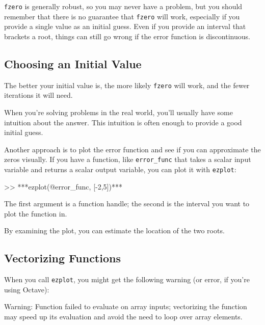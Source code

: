 {\tt fzero} is generally robust, so you may never have a problem, but you should remember that there is no guarantee that {\tt fzero} will work, especially if you provide a single value as an initial guess.  Even if you provide an interval that brackets a root, things can still go wrong if the error function is discontinuous.


\subsection{Choosing an Initial Value}

The better your initial value is, the more likely
{\tt fzero} will work, and the fewer iterations it will
need.

When you're solving problems in the real world, you'll usually
have some intuition about the answer.  This intuition is often enough
to provide a good initial guess.


Another approach is to plot the error function and see if you can
approximate the zeros visually.  If you have a function, like
\verb"error_func" that takes a scalar input variable and returns
a scalar output variable, you can plot it with {\tt ezplot}:

\begin{code}
>> ***ezplot(@error_func, [-2,5])***
\end{code}


The first argument is a function handle; the second is the interval you want to plot the function in.

By examining the plot, you can estimate the location of the two roots.


\subsection{Vectorizing Functions}


When you call {\tt ezplot}, you might get the following warning (or error, if you're using Octave):

\begin{code}
Warning: Function failed to evaluate on array inputs;
vectorizing the function may speed up its evaluation and 
avoid the need to loop over array elements. 
\end{code}


